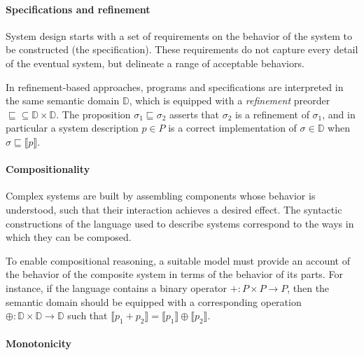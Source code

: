\documentclass[sigplan,10pt,review,anonymous]{acmart}
\begin{document}

\paragraph{Specifications and refinement} %

System design starts with a set of requirements
on the behavior of the system to be constructed
(the specification).
These requirements do not capture every detail
of the eventual system,
but delineate a range of acceptable behaviors.

In refinement-based approaches,
programs and specifications are interpreted in the same
semantic domain $\mathbb{D}$,
which is equipped with a \emph{refinement} preorder
${\sqsubseteq} \subseteq \mathbb{D} \times \mathbb{D}$.
The proposition $\sigma_1 \sqsubseteq \sigma_2$
asserts that $\sigma_2$ is a refinement of $\sigma_1$,
and in particular a system description $p \in P$ is a correct implementation
of $\sigma \in \mathbb{D}$ when
$\sigma \sqsubseteq \llbracket p \rrbracket$.


\paragraph{Compositionality} %

Complex systems are built by assembling components
whose behavior is understood,
such that their interaction achieves a desired effect.
The syntactic constructions of
the language used to describe systems
correspond to the ways in which they can be composed.

To enable compositional reasoning,
a suitable model must provide an account of
the behavior of the composite system
in terms of the behavior of its parts.
For instance,
if the language contains a binary operator
${+} : P \times P \rightarrow P$,
then the semantic domain should be equipped with
a corresponding operation
${\oplus} : \mathbb{D} \times \mathbb{D} \rightarrow \mathbb{D}$
such that
$\llbracket p_1 + p_2 \rrbracket =
 \llbracket p_1 \rrbracket \oplus \llbracket p_2 \rrbracket$.


\paragraph{Monotonicity} %
\end{document}
